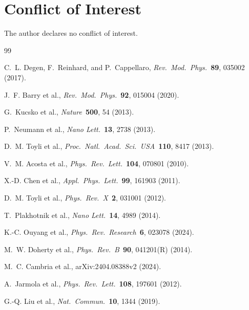 \documentclass[12pt,a4paper]{article}
\begin{document}
\section*{Conflict of Interest}

The author declares no conflict of interest.


\begin{thebibliography}{99}

C.~L. Degen, F.~Reinhard, and P.~Cappellaro,
\textit{Rev.\ Mod.\ Phys.}\ \textbf{89}, 035002 (2017).

J.~F. Barry et al.,
\textit{Rev.\ Mod.\ Phys.}\ \textbf{92}, 015004 (2020).

G.~Kucsko et al.,
\textit{Nature}\ \textbf{500}, 54 (2013).

P.~Neumann et al.,
\textit{Nano Lett.}\ \textbf{13}, 2738 (2013).

D.~M. Toyli et al.,
\textit{Proc.\ Natl.\ Acad.\ Sci.\ USA}\ \textbf{110}, 8417 (2013).

V.~M. Acosta et al.,
\textit{Phys.\ Rev.\ Lett.}\ \textbf{104}, 070801 (2010).

X.-D. Chen et al.,
\textit{Appl.\ Phys.\ Lett.}\ \textbf{99}, 161903 (2011).

D.~M. Toyli et al.,
\textit{Phys.\ Rev.\ X}\ \textbf{2}, 031001 (2012).

T.~Plakhotnik et al.,
\textit{Nano Lett.}\ \textbf{14}, 4989 (2014).

K.-C. Ouyang et al.,
\textit{Phys.\ Rev.\ Research}\ \textbf{6}, 023078 (2024).

M.~W. Doherty et al.,
\textit{Phys.\ Rev.\ B}\ \textbf{90}, 041201(R) (2014).

M.~C. Cambria et al.,
arXiv:2404.08388v2 (2024).

A.~Jarmola et al.,
\textit{Phys.\ Rev.\ Lett.}\ \textbf{108}, 197601 (2012).

G.-Q. Liu et al.,
\textit{Nat.\ Commun.}\ \textbf{10}, 1344 (2019).

\end{thebibliography}
\end{document}
